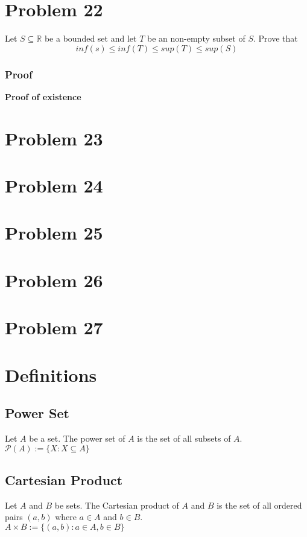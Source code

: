 \documentclass{article}
\begin{document}
\section*{Problem 22}
Let $S \subseteq \mathbb{R}$ be a bounded set and let $T$ be an non-empty subset of $S$. Prove that $$inf(s) \leq inf(T) \leq sup(T) \leq sup(S)$$
\subsubsection*{Proof}
\textbf{Proof of existence}



\section*{Problem 23}

\section*{Problem 24}

\section*{Problem 25}

\section*{Problem 26}

\section*{Problem 27}

\section*{Definitions}
\subsection*{Power Set}
Let $A$ be a set. The power set of $A$ is the set of all subsets of $A$.\\
$\mathscr{P}(A) := \{X: X \subseteq A\}$\\

\subsection*{Cartesian Product}
Let $A$ and $B$ be sets. The Cartesian product of $A$ and $B$ is the set of all ordered pairs $(a,b)$ where $a \in A$ and $b \in B$.\\
$A \times B := \{(a,b): a\in A, b \in B \}$
\end{document}

